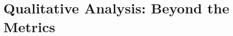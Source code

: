 \documentclass[aspectratio=169,10pt]{beamer}
\begin{document}
\begin{frame}
\begin{columns}[T]
\begin{column}{0.45\textwidth}
        \end{column}
    \end{columns}
\end{frame}

\section{Qualitative Analysis: Beyond the Metrics}

    

            
        
            
\end{document}

